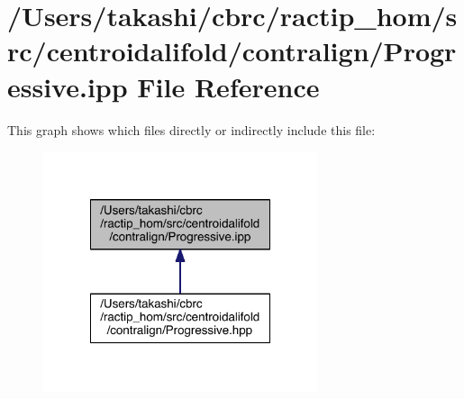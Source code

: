 \hypertarget{_progressive_8ipp}{\section{/\+Users/takashi/cbrc/ractip\+\_\+hom/src/centroidalifold/contralign/\+Progressive.ipp File Reference}
\label{_progressive_8ipp}
}
This graph shows which files directly or indirectly include this file\+:
\nopagebreak
\begin{figure}[H]
\begin{center}
\leavevmode
\includegraphics[width=228pt]{_progressive_8ipp__dep__incl}
\end{center}
\end{figure}
